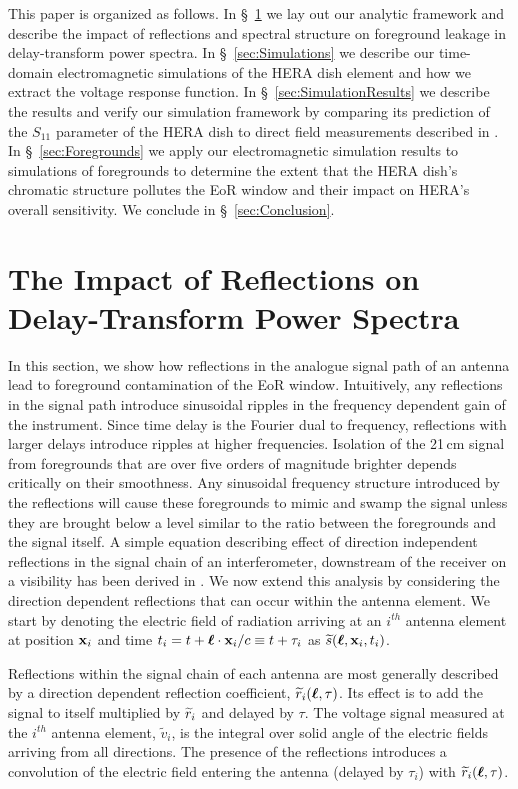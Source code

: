 \documentclass[twocolumn]{emulateapj}
\begin{document}
This paper is organized as follows. In \S~\ref{sec:Formalism} we lay out our analytic framework and describe the impact of reflections and spectral structure on foreground leakage in delay-transform power spectra. In \S~\ref{sec:Simulations} we describe our time-domain electromagnetic simulations of the HERA dish element and how we extract the voltage response function. In \S~\ref{sec:SimulationResults} we describe the results and verify our simulation framework by comparing its prediction of the $S_{11}$ parameter of the HERA dish to direct field measurements described in \citep{Patra:2016}. In \S~\ref{sec:Foregrounds} we apply our electromagnetic simulation results to simulations of foregrounds to determine the extent that the HERA dish's chromatic structure pollutes the EoR window and their impact on HERA's overall sensitivity. We conclude in \S~\ref{sec:Conclusion}.

\section{The Impact of Reflections on Delay-Transform Power Spectra}\label{sec:Formalism}
In this section, we show how reflections in the analogue signal path of an antenna lead to foreground contamination of the EoR window. Intuitively, any reflections in the signal path introduce sinusoidal ripples in the frequency dependent gain of the instrument. Since time delay is the Fourier dual to frequency, reflections with larger delays introduce ripples at higher frequencies. Isolation of the 21\,cm signal from foregrounds that are over five orders of magnitude brighter depends critically on their smoothness. Any sinusoidal frequency structure introduced by the reflections will cause these foregrounds to mimic and swamp the signal unless they are brought below a level similar to the ratio between the foregrounds and the signal itself. A simple equation describing effect of direction independent reflections in the signal chain of an interferometer, downstream of the receiver on a visibility has been derived in \citet{EwallWice:2015a}. We now extend this analysis by considering the direction dependent reflections that can occur within the antenna element. 
We start by denoting the electric field of radiation arriving at an $i^{th}$ antenna element at position ${\bf x}_i$ and time $t_i = t + \boldsymbol{\ell} \cdot {\bf x}_i /c \equiv t+\tau_i$ as ${\widetilde{s}}(\boldsymbol{\ell},{\bf x}_i,t_i)$. 

Reflections within the signal chain of each antenna are most generally described by a direction dependent reflection coefficient, ${\widetilde{r}}_i(\boldsymbol{\ell},\tau)$. Its effect is to add the signal to itself multiplied by ${\widetilde{r}}_i$ and delayed by $\tau$. The voltage signal measured at the $i^{th}$ antenna element, $\widetilde{v}_i$, is the integral over solid angle of the electric fields arriving from all directions. The presence of the reflections introduces a convolution of the electric field entering the antenna (delayed by $\tau_i$) with ${\widetilde{r}}_i(\boldsymbol{\ell},\tau)$.
\end{document}
